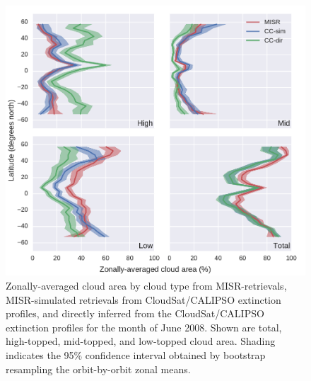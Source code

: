 \begin{figure}[tp]
\centering
\includegraphics{graphics/misr_cldmisr_zonal_2008-06.pdf}
\caption{\label{fig:misr_cldmisr_zonal_jun}Zonally-averaged cloud area
by cloud type from MISR-retrievals, MISR-simulated retrievals from
CloudSat/CALIPSO extinction profiles, and directly inferred from the
CloudSat/CALIPSO extinction profiles for the month of June 2008. Shown
are total, high-topped, mid-topped, and low-topped cloud area. Shading
indicates the 95\% confidence interval obtained by bootstrap resampling
the orbit-by-orbit zonal
means.}\label{fig:misrux5fcldmisrux5fzonalux5fjun}
\end{figure}


